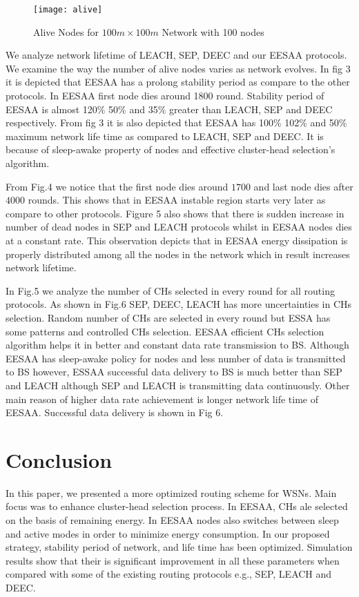 \documentclass[journal]{IEEEtran}
\begin{document}
\begin{figure*}[t]
\centering
  \texttt{[image: alive]}
  \caption{Alive Nodes for $100m\times100m$ Network with 100 nodes}\label{abc}
\end{figure*}

We analyze network lifetime of LEACH, SEP, DEEC and our EESAA protocols. We examine the way the number of alive nodes varies as network evolves. In fig 3 it is depicted that EESAA has a prolong stability period as compare to the other protocols. In EESAA first node dies around 1800 round. Stability period of EESAA is almost 120$\%$ 50$\%$ and 35$\%$ greater than LEACH, SEP and DEEC respectively. From fig 3 it is also depicted that EESAA has 100$\%$ 102$\%$ and 50$\%$ maximum network life time as compared to LEACH, SEP and DEEC. It is because of sleep-awake property of nodes and effective cluster-head selection's algorithm.

From Fig.4 we notice that the first node dies around $1700$ and last node dies after $4000$ rounds. This shows that in EESAA instable region starts very later as compare to other protocols. Figure 5 also shows that there is sudden increase in number of dead nodes in SEP and LEACH protocols whilst in EESAA nodes dies at a constant rate. This observation depicts that in EESAA energy dissipation is properly distributed among all the nodes in the network which in result increases network lifetime.

In Fig.5 we analyze the number of CHs selected in every round for all routing protocols. As shown in Fig.6 SEP, DEEC, LEACH has more uncertainties in CHs selection. Random number of CHs are selected in every round but ESSA has some patterns and controlled CHs selection. EESAA efficient CHs selection algorithm helps it in better and constant data rate transmission to BS. Although EESAA has sleep-awake policy for nodes and less number of data is transmitted to BS however, ESSAA successful data delivery to BS is much better than SEP and LEACH although SEP and LEACH is transmitting data continuously. Other main reason of higher data rate achievement is longer network life time of EESAA. Successful data delivery is shown in Fig 6.

\section{Conclusion}
In this paper, we presented a more optimized routing scheme for WSNs. Main focus was to enhance cluster-head selection process. In EESAA, CHs ale selected on the basis of remaining energy. In EESAA nodes also switches between sleep and active modes in order to minimize energy consumption. In our proposed strategy, stability period of network, and life time has been optimized. Simulation results show that their is significant improvement in all these parameters when compared with some of the existing routing protocols e.g., SEP, LEACH and DEEC.
\end{document}
